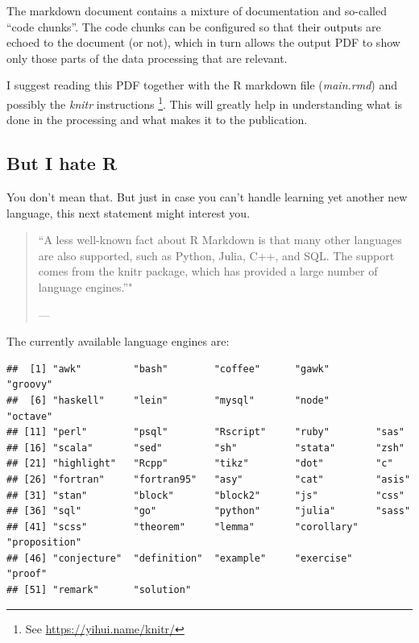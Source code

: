 \documentclass[11pt,]{article}
\newenvironment{Shaded}{\begin{snugshade}}{\end{snugshade}}
\newcommand{\KeywordTok}[1]{\textcolor[rgb]{0.13,0.29,0.53}{\textbf{#1}}}
\newcommand{\NormalTok}[1]{#1}
\newcommand{\OperatorTok}[1]{\textcolor[rgb]{0.81,0.36,0.00}{\textbf{#1}}}
\let\rmarkdownfootnote\footnote%
\def\footnote{\protect\rmarkdownfootnote}
\begin{document}
The markdown document contains a mixture of documentation and so-called ``code chunks''. The code chunks can be configured so that their outputs are echoed to the document (or not), which in turn allows the output PDF to show only those parts of the data processing that are relevant.

I suggest reading this PDF together with the R markdown file (\emph{main.rmd}) and possibly the \emph{knitr} instructions \footnote{See \url{https://yihui.name/knitr/}}. This will greatly help in understanding what is done in the processing and what makes it to the publication.

\hypertarget{but-i-hate-r}{%
\subsection{But I hate R}\label{but-i-hate-r}}

You don't mean that. But just in case you can't handle learning yet another new language, this next statement might interest you.

\begin{quote}
``A less well-known fact about R Markdown is that many other languages are also supported, such as Python, Julia, C++, and SQL. The support comes from the knitr package, which has provided a large number of language engines.''"

--- \citet{R-Markdown-Guide}
\end{quote}

The currently available language engines are:

\begin{Shaded}
\end{Shaded}

\begin{verbatim}
##  [1] "awk"         "bash"        "coffee"      "gawk"        "groovy"     
##  [6] "haskell"     "lein"        "mysql"       "node"        "octave"     
## [11] "perl"        "psql"        "Rscript"     "ruby"        "sas"        
## [16] "scala"       "sed"         "sh"          "stata"       "zsh"        
## [21] "highlight"   "Rcpp"        "tikz"        "dot"         "c"          
## [26] "fortran"     "fortran95"   "asy"         "cat"         "asis"       
## [31] "stan"        "block"       "block2"      "js"          "css"        
## [36] "sql"         "go"          "python"      "julia"       "sass"       
## [41] "scss"        "theorem"     "lemma"       "corollary"   "proposition"
## [46] "conjecture"  "definition"  "example"     "exercise"    "proof"      
## [51] "remark"      "solution"
\end{verbatim}
\end{document}

